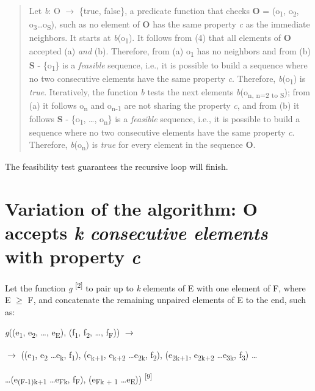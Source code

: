 \documentclass[12pt]{article}
\begin{document}
\begin{quote}
Let \textit{b}: O $\rightarrow$ \{true, false\}, a predicate function that checks \textbf{O} 
= (o\textsubscript{1}, o\textsubscript{2}, o\textsubscript{3}\ldots o\textsubscript{\textbar{}S\textbar{}}), such as no element of \textbf{O} has the same property \textit{c} as the immediate neighbors. It starts at \textit{b}(o\textsubscript{1}). It follows from (4) that 
all elements of \textbf{O} accepted (a) \textit{and} (b). Therefore, from (a) o\textsubscript{1} 
has no neighbors and from (b) \textbf{S} - \{o\textsubscript{1}\} is a \textit{feasible} 
sequence, i.e., it is possible to build a sequence where no two consecutive elements 
have the same property \textit{c}. Therefore,\textit{ b}(o\textsubscript{1}) is 
\textit{true}. Iteratively, the function \textit{b} tests the next elements \textit{b}(o\textsubscript{n, 
n=2 to \textbar{}S\textbar{}}); from (a) it follows o\textsubscript{n} and o\textsubscript{n-1 
}are not sharing the property \textit{c}, and from (b) it follows \textbf{S} - 
\{o\textsubscript{1}, \ldots, o\textsubscript{n}\} is a \textit{feasible} sequence, 
i.e., it is possible to build a sequence where no two consecutive elements have 
the same property \textit{c}. Therefore,\textit{ b}(o\textsubscript{n}) is \textit{true} 
for every element in the sequence \textbf{O}.
\end{quote}

\textsuperscript{\textdaggerdbl} The feasibility test guarantees the recursive loop will finish.

\section*{Variation of the algorithm: \textbf{O} accepts \textit{k consecutive elements} 
with property \textit{c}}

Let the function \textit{g} \textsuperscript{[2]} to pair up to \textit{k} elements 
of E with one element of F, where \textbar{}E\textbar{} $\geq$ \textbar{}F\textbar{}, 
and concatenate the remaining unpaired elements of E to the end, such as:

\begin{center}
\textit{g}((e\textsubscript{1}, e\textsubscript{2}, \ldots, e\textsubscript{\textbar{}E\textbar{}}), 
(f\textsubscript{1}, f\textsubscript{2}, \ldots, f\textsubscript{\textbar{}F\textbar{}})) 
$\rightarrow$ 
\end{center}
\begin{center}
$\rightarrow$ ((e\textsubscript{1}, e\textsubscript{2} \ldots e\textsubscript{k}, f\textsubscript{1}), 
(e\textsubscript{k+1}, e\textsubscript{k+2} \ldots e\textsubscript{2k}, f\textsubscript{2}), 
(e\textsubscript{2k+1}, e\textsubscript{2k+2} \ldots e\textsubscript{3k}, f\textsubscript{3}) \ldots
\end{center}
\begin{center}
\ldots (e\textsubscript{(\textbar{}F\textbar{}-1)k+1} \ldots e\textsubscript{\textbar{}F\textbar{}k}, 
f\textsubscript{\textbar{}F\textbar{}}), (e\textsubscript{\textbar{}F\textbar{}k 
+ 1} \ldots e\textsubscript{\textbar{}E\textbar{}})) \textsuperscript{[9]}
\end{center}
\end{document}
